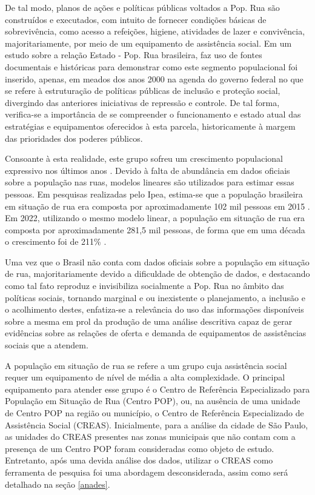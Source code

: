 De tal modo, planos de ações e políticas públicas voltados a Pop. Rua são construídos e executados, com intuito de fornecer condições básicas de sobrevivência, como acesso a refeições, higiene, atividades de lazer e convivência, majoritariamente, por meio de um equipamento de assistência social. Em um estudo sobre a relação Estado - Pop. Rua brasileira, \cite{barbosa2018implementaccao} faz uso de fontes documentais e históricas para demonstrar como este segmento populacional foi inserido, apenas, em meados dos anos 2000 na agenda do governo federal no que se refere à estruturação de políticas públicas de inclusão e proteção social, divergindo das anteriores iniciativas de repressão e controle. De tal forma, verifica-se a importância de se compreender o funcionamento e estado atual das estratégias e equipamentos oferecidos à esta parcela, historicamente à margem das prioridades dos poderes públicos.

Consoante à esta realidade, este grupo sofreu um crescimento populacional expressivo nos últimos anos  \cite{silvaaumento}. Devido à falta de abundância em dados oficiais sobre a população nas ruas, modelos lineares são utilizados para estimar essas pessoas. Em pesquisas realizadas pelo Ipea, estima-se que a população brasileira em situação de rua era composta por aproximadamente 102 mil pessoas em 2015 \cite{natalino2016estimativa}. Em 2022, utilizando o mesmo modelo linear, a população em situação de rua era composta por aproximadamente 281,5 mil pessoas, de forma que em uma década o crescimento foi de 211\% .

Uma vez que o Brasil não conta com dados oficiais sobre a população em situação de rua, majoritariamente devido a dificuldade de obtenção de dados, e destacando como tal fato reproduz e invisibiliza socialmente a Pop. Rua no âmbito das políticas sociais, tornando marginal e ou inexistente o planejamento, a inclusão e o acolhimento destes, enfatiza-se a relevância do uso das informações disponíveis sobre a mesma em prol da produção de uma análise descritiva capaz de gerar evidências sobre as relações de oferta e demanda de equipamentos de assistências sociais que a atendem. 

A população em situação de rua se refere a um grupo cuja assistência social requer um equipamento de nível de média a alta complexidade. O principal equipamento para atender esse grupo é o Centro de Referência Especializado para População em Situação de Rua (Centro POP), ou, na ausência de uma unidade de Centro POP na região ou município, o Centro de Referência Especializado de Assistência Social (CREAS). Inicialmente, para a análise da cidade de São Paulo, as unidades do CREAS presentes nas zonas municipais que não contam com a presença de um Centro POP foram consideradas como objeto de estudo. Entretanto, após uma devida análise dos dados, utilizar o CREAS como ferramenta de pesquisa foi uma abordagem desconsiderada, assim como será detalhado na seção \ref{anades}. 

